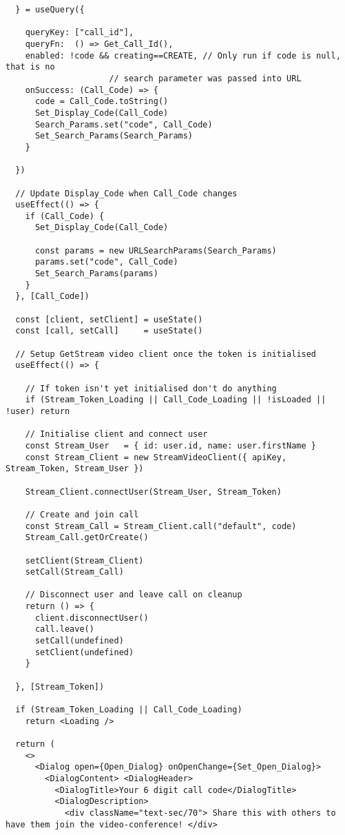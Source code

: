 \begin{verbatim}
  } = useQuery({

    queryKey: ["call_id"],
    queryFn:  () => Get_Call_Id(),
    enabled: !code && creating==CREATE, // Only run if code is null, that is no
                     // search parameter was passed into URL
    onSuccess: (Call_Code) => {
      code = Call_Code.toString()
      Set_Display_Code(Call_Code)
      Search_Params.set("code", Call_Code)
      Set_Search_Params(Search_Params)
    }

  })

  // Update Display_Code when Call_Code changes
  useEffect(() => {
    if (Call_Code) {
      Set_Display_Code(Call_Code)

      const params = new URLSearchParams(Search_Params)
      params.set("code", Call_Code)
      Set_Search_Params(params)
    }
  }, [Call_Code])

  const [client, setClient] = useState()
  const [call, setCall]     = useState()

  // Setup GetStream video client once the token is initialised
  useEffect(() => {

    // If token isn't yet initialised don't do anything
    if (Stream_Token_Loading || Call_Code_Loading || !isLoaded || !user) return

    // Initialise client and connect user
    const Stream_User   = { id: user.id, name: user.firstName }
    const Stream_Client = new StreamVideoClient({ apiKey, Stream_Token, Stream_User })

    Stream_Client.connectUser(Stream_User, Stream_Token)

    // Create and join call
    const Stream_Call = Stream_Client.call("default", code)
    Stream_Call.getOrCreate()

    setClient(Stream_Client)
    setCall(Stream_Call)

    // Disconnect user and leave call on cleanup
    return () => {
      client.disconnectUser()
      call.leave()
      setCall(undefined)
      setClient(undefined)
    }

  }, [Stream_Token])

  if (Stream_Token_Loading || Call_Code_Loading)
    return <Loading />

  return (
    <>
      <Dialog open={Open_Dialog} onOpenChange={Set_Open_Dialog}>
        <DialogContent> <DialogHeader>
          <DialogTitle>Your 6 digit call code</DialogTitle>
          <DialogDescription>
            <div className="text-sec/70"> Share this with others to have them join the video-conference! </div>


\end{verbatim}
